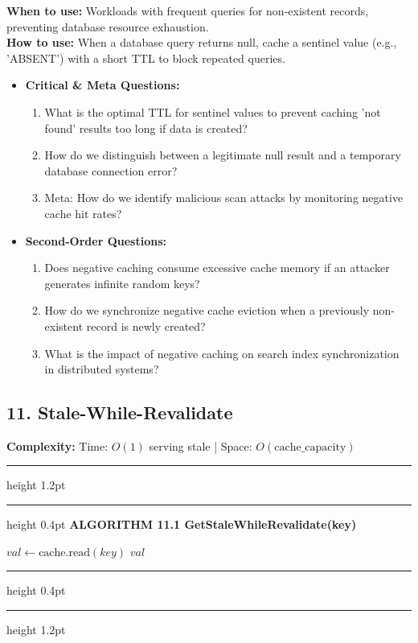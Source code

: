 \documentclass[11pt,a4paper]{article}
\newenvironment{textbookalgo}[2]{%
  \par\addvspace{1.2em}\noindent
  \hrule height 1.2pt
  \vspace{1.5pt}
  \hrule height 0.4pt
  \vspace{5pt}
  {\noindent\large\bfseries\sffamily ALGORITHM #1 \quad #2}
  \par\vspace{5pt}
  \RestyleAlgo{plain}
}{%
  \par\vspace{4pt}
  \hrule height 0.4pt
  \vspace{1.5pt}
  \hrule height 1.2pt
  \par\addvspace{1.2em}
}
\theoremstyle{definition}
\begin{document}
\noindent
\textbf{When to use:} Workloads with frequent queries for non-existent records, preventing database resource exhaustion.\\
\textbf{How to use:} When a database query returns null, cache a sentinel value (e.g., 'ABSENT') with a short TTL to block repeated queries.
\begin{itemize}[leftmargin=*]
  \item[] \textbf{Critical \& Meta Questions:}
  \begin{enumerate}
  \item What is the optimal TTL for sentinel values to prevent caching 'not found' results too long if data is created?
  \item How do we distinguish between a legitimate null result and a temporary database connection error?
  \item Meta: How do we identify malicious scan attacks by monitoring negative cache hit rates?
  \end{enumerate}
  \item[] \textbf{Second-Order Questions:}
  \begin{enumerate}
  \item Does negative caching consume excessive cache memory if an attacker generates infinite random keys?
  \item How do we synchronize negative cache eviction when a previously non-existent record is newly created?
  \item What is the impact of negative caching on search index synchronization in distributed systems?
  \end{enumerate}
\end{itemize}
\medskip

\clearpage
\subsection{11. Stale-While-Revalidate}

\noindent
\textbf{Complexity:} Time: $O(1)$ serving stale | Space: $O(\text{cache\_capacity})$
\smallskip

\begin{textbookalgo}{11.1}{GetStaleWhileRevalidate(key)}
\begin{algorithm}[H]
$val \leftarrow \text{cache.read}(key)$\;
\Return $val$\;
\end{algorithm}
\end{textbookalgo}
\end{document}
